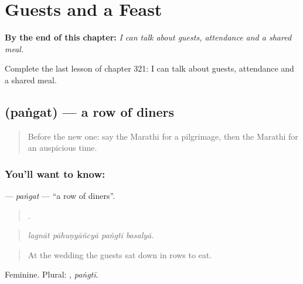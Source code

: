
\chapter{Guests and a Feast}
\label{ch:mr-guests-and-a-feast}

\begin{chapteropening}
\textbf{By the end of this chapter:} \emph{I can talk about guests, attendance and a shared meal.}

Complete the last lesson of chapter 321: I can talk about guests, attendance and a shared meal.
\end{chapteropening}

\section[\texorpdfstring{\mr{पंगत} (paṅgat)}{पंगत (paṅgat)}]{ (paṅgat) — a row of diners}

\label{lesson:MR-C321-pangat}



\begin{quote}
Before the new one: say the Marathi for a pilgrimage, then the Marathi for an auspicious time.
\end{quote}

\subsection*{You'll want to know: }
\textbf{} — \emph{paṅgat} — \textquotedblleft{}a row of diners\textquotedblright{}.

\begin{quote}
   .
\end{quote}

\begin{quote}
\emph{lagnāt pāhuṇyāñcyā paṅgtī basalyā.}
\end{quote}

\begin{quote}
At the wedding the guests sat down in rows to eat.
\end{quote}

Feminine. Plural: , \emph{paṅgtī}.

